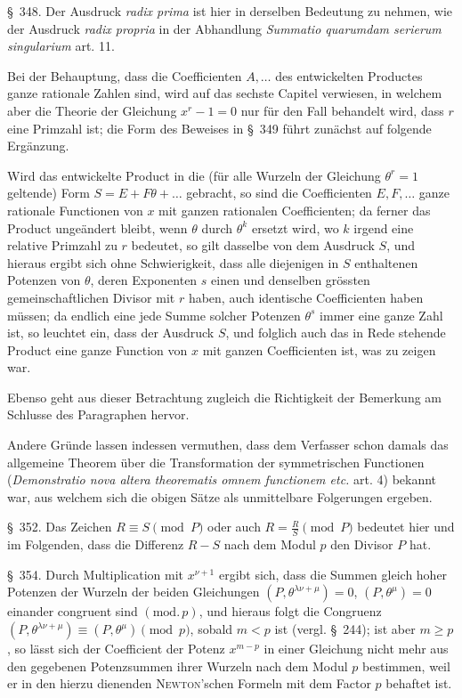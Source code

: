 \documentclass[12pt,a4paper]{article}
\begin{document}
\S\ 348. Der Ausdruck \textit{radix prima} ist hier in derselben Bedeutung zu nehmen, wie der Ausdruck \textit{radix propria} in der Abhandlung \textit{Summatio quarumdam serierum singularium} art. 11.

Bei der Behauptung, dass die Coefficienten $A,\ldots$ des entwickelten Productes ganze rationale Zahlen sind, wird auf das sechste Capitel verwiesen, in welchem aber die Theorie der Gleichung $x^r-1=0$ nur f\"ur den Fall behandelt wird, dass $r$ eine Primzahl ist; die Form des Beweises in \S\ 349 f\"uhrt zun\"achst auf folgende Erg\"anzung.

Wird das entwickelte Product in die (f\"ur alle Wurzeln der Gleichung $\theta^r=1$ geltende) Form $S = E + F\theta + \ldots$ gebracht, so sind die Coefficienten $E, F,\ldots$ ganze rationale Functionen von $x$ mit ganzen rationalen Coefficienten; da ferner das Product unge\"andert bleibt, wenn $\theta$ durch $\theta^k$ ersetzt wird, wo $k$ irgend eine relative Primzahl zu $r$ bedeutet, so gilt dasselbe von dem Ausdruck $S$, und hieraus ergibt sich ohne Schwierigkeit, dass alle diejenigen in $S$ enthaltenen Potenzen von $\theta$, deren Exponenten $s$ einen und denselben gr\"ossten gemeinschaftlichen Divisor mit $r$ haben, auch identische Coefficienten haben m\"ussen; da endlich eine jede Summe solcher Potenzen $\theta^s$ immer eine ganze Zahl ist, so leuchtet ein, dass der Ausdruck $S$, und folglich auch das in Rede stehende Product eine ganze Function von $x$ mit ganzen Coefficienten ist, was zu zeigen war.

Ebenso geht aus dieser Betrachtung zugleich die Richtigkeit der Bemerkung am Schlusse des Paragraphen hervor.

Andere Gr\"unde lassen indessen vermuthen, dass dem Verfasser schon damals das allgemeine Theorem \"uber die Transformation der symmetrischen Functionen (\textit{Demonstratio nova altera theorematis omnem functionem etc.} art. 4) bekannt war, aus welchem sich die obigen S\"atze als unmittelbare Folgerungen ergeben.

\S\ 352. Das Zeichen $R\equiv S \pmod{P}$ oder auch $R=\frac{R}{S} \pmod{P}$ bedeutet hier und im Folgenden, dass die Differenz $R-S$ nach dem Modul $p$ den Divisor $P$ hat.

\S\ 354. Durch Multiplication mit $x^{\nu+1}$ ergibt sich, dass die Summen gleich hoher Potenzen der Wurzeln der beiden Gleichungen $(P,\theta^{\lambda\nu+\mu})=0$, $(P,\theta^\mu)=0$ einander congruent sind $(\text{mod.}\,p)$, und hieraus folgt die Congruenz $(P,\theta^{\lambda\nu+\mu})\equiv (P,\theta^\mu) \pmod{p}$, sobald $m<p$ ist (vergl. \S\ 244); ist aber $m\ge p$, so l\"asst sich der Coefficient der Potenz $x^{m-p}$ in einer Gleichung nicht mehr aus den gegebenen Potenzsummen ihrer Wurzeln nach dem Modul $p$ bestimmen, weil er in den hierzu dienenden \textsc{Newton}'schen Formeln mit dem Factor $p$ behaftet ist.
\end{document}
